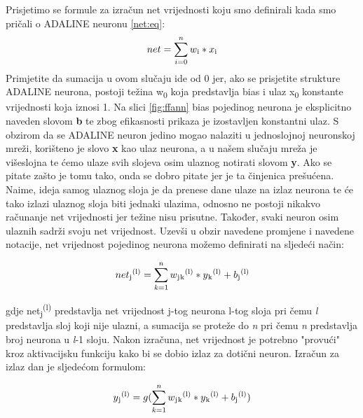 \documentclass[times, utf8, zavrsni]{fer}
\begin{document}
\bigskip

Prisjetimo se formule za izračun net vrijednosti koju smo definirali kada smo pričali o ADALINE neuronu \eqref{net:eq}:
\[\text{$net = \sum\limits_{i=0}^n w\textsubscript{i} * x\textsubscript{i}$}\]
Primjetite da sumacija u ovom slučaju ide od 0 jer, ako se prisjetite strukture ADALINE neurona, postoji težina w\textsubscript{0} koja predstavlja bias i ulaz x\textsubscript{0} konstante vrijednosti koja iznosi 1. Na slici \ref{fig:ffann} bias pojedinog neurona je eksplicitno naveden slovom \textbf{b} te zbog efikasnosti prikaza je izostavljen konstantni ulaz. S obzirom da se ADALINE neuron jedino mogao nalaziti u jednoslojnoj neuronskoj mreži, korišteno je slovo \textbf{x} kao ulaz neurona, a u našem slučaju mreža je višeslojna te ćemo ulaze svih slojeva osim ulaznog notirati slovom \textbf{y}. Ako se pitate zašto je tomu tako, onda se dobro pitate jer je ta činjenica prešućena. Naime, ideja samog ulaznog sloja je da prenese dane ulaze na izlaz neurona te će tako izlazi ulaznog sloja biti jednaki ulazima, odnosno ne postoji nikakvo računanje net vrijednosti jer težine nisu prisutne. Također, svaki neuron osim ulaznih sadrži svoju net vrijednost. Uzevši u obzir navedene promjene i navedene notacije, net vrijednost pojedinog neurona možemo definirati na sljedeći način:

\begin{equation}
    \label{eq:novi-net}
    \text{$net\textsubscript{j}\textsuperscript{(l)} = \sum\limits_{k=1}^n w\textsubscript{j}\textsubscript{k}\textsuperscript{(l)} * y\textsubscript{k}\textsuperscript{(l)} + b\textsubscript{j}\textsuperscript{(l)}$}
\end{equation}

gdje net\textsubscript{j}\textsuperscript{(l)} predstavlja net vrijednost j-tog neurona l-tog sloja pri čemu \textit{l} predstavlja sloj koji nije ulazni, a sumacija se proteže do \textit{n} pri čemu \textit{n} predstavlja broj neurona u \textit{l}-1 sloju. Nakon izračuna, net vrijednost je potrebno "provući" kroz aktivacijsku funkciju kako bi se dobio izlaz za dotični neuron. Izračun za izlaz dan je sljedećom formulom: 

\begin{equation}
    \label{eq:izlaz}
    \text{$y\textsubscript{j}\textsuperscript{(l)} = g(\sum\limits_{k=1}^n w\textsubscript{j}\textsubscript{k}\textsuperscript{(l)} * y\textsubscript{k}\textsuperscript{(l)} + b\textsubscript{j}\textsuperscript{(l)})$}
\end{equation}
\end{document}
